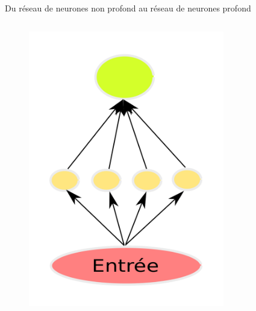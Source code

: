 \documentclass{beamer}
\begin{document}
\begin{frame}{Du réseau de neurones non profond au réseau de neurones profond}

  \begin{columns}
    {
      \begin{figure}
        \centering
        \includegraphics[scale=0.1750]{../Figures/Shallow}
      \end{figure}
    }
    {
      \begin{figure}
        \centering

\end{figure}}
\end{columns}
\end{frame}
\end{document}
